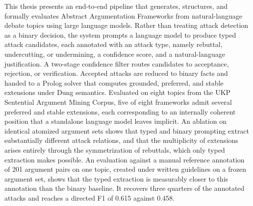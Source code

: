 %
\label{sec:abstract}

This thesis presents an end-to-end pipeline that generates, structures, and
formally evaluates Abstract Argumentation Frameworks from natural-language debate
topics using large language models. Rather than treating attack detection as a
binary decision, the system prompts a language model to produce typed
attack candidates, each annotated with an attack type, namely rebuttal,
undercutting, or undermining, a confidence score, and a natural-language
justification. A two-stage confidence filter routes candidates to acceptance,
rejection, or verification. Accepted attacks are reduced to binary facts and
handed to a Prolog solver that computes grounded, preferred, and stable
extensions under Dung semantics. Evaluated on eight topics from the UKP
Sentential Argument Mining Corpus, five of eight frameworks
admit several preferred and stable extensions, each corresponding to an
internally coherent position that a standalone language model leaves implicit.
An ablation on identical atomized argument sets shows that typed and binary
prompting extract substantially different attack relations, and that the
multiplicity of extensions arises entirely through the symmetrization of
rebuttals, which only typed extraction makes possible. An evaluation against a
manual reference annotation of 201 argument pairs on one topic, created under
written guidelines on a frozen argument set, shows that the typed extraction is
measurably closer to this annotation than the binary baseline. It
recovers three quarters of the annotated attacks and reaches a directed F1 of
0.615 against 0.458.

